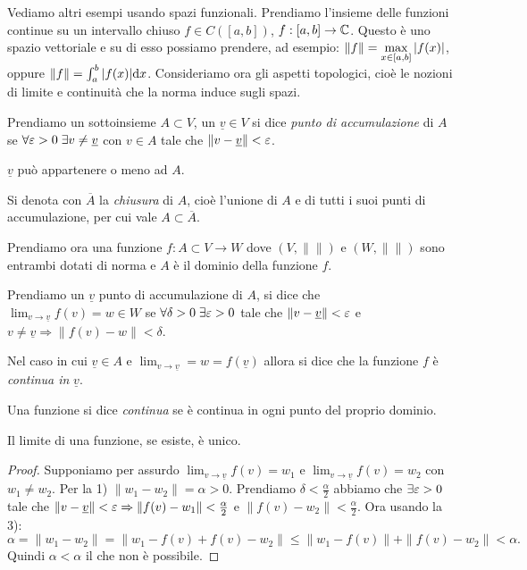 Vediamo altri esempi usando spazi funzionali. Prendiamo l'insieme delle
funzioni continue su un intervallo chiuso $f \in C\left( [a, b] \right)$,
$f: [a, b] \to \mathbb C$. Questo è uno spazio vettoriale e su di esso possiamo
prendere, ad esempio: $\|f\| = \displaystyle \max_{x \in [a, b]} {\left|f(x)\right|}$,
oppure $\|f\| = \int_a^b {\left|f(x)\right|} \mathrm{d} x$.
Consideriamo ora gli aspetti topologici, cioè le nozioni di limite e continuità
che la norma induce sugli spazi.
\begin{definition}
Prendiamo un sottoinsieme $A \subset V$, un $\underline{v} \in V$ si dice
\emph{punto di accumulazione} di $A$ se $\forall \varepsilon > 0 \; \exists v \neq
\underline{v}$ con $v \in A$ tale che  $\|v - \underline{v}\| < \varepsilon$. 
\end{definition}
\begin{remark}
$\underline{v}$ può appartenere o meno ad $A$.
\end{remark}
\begin{definition}
Si denota con $\overline{A}$ la \emph{chiusura} di $A$, cioè l'unione di $A$ e
di tutti i suoi punti di accumulazione, per cui vale $A \subset \overline{A}$.
\end{definition}
Prendiamo ora una funzione $f: A \subset V \to W$ dove $\left(V, \| \| \right)$ 
e $\left(W, \| \| \right)$ sono entrambi dotati di norma e $A$ è il dominio
della funzione $f$.
\begin{definition}
Prendiamo un $\underline{v}$ punto di accumulazione di $A$, si dice che 
$\displaystyle \lim_{v \to \underline{v}} f(v) = w \in W$ se 
$\forall \delta > 0 \; \exists \varepsilon > 0$ tale che $ \|v - \underline{v}\| <
\varepsilon$ e $v \neq \underline{v} \Rightarrow \|f(v) - w\| < \delta$.
\end{definition}
\begin{definition}
Nel caso in cui $\underline{v} \in A$ e $\lim_{v \to \underline{v}} = w =
f(\underline{v})$ allora si dice che la funzione $f$ è \emph{continua in}
$\underline{v}$.
\end{definition}
\begin{definition}[continuità]
Una funzione si dice \emph{continua} se è continua in ogni punto del proprio
dominio.
\end{definition}
\begin{theorem}
Il limite di una funzione, se esiste, è unico.
\end{theorem}
\begin{proof}
Supponiamo per assurdo $ \displaystyle \lim_{v \to \underline{v}} f(v) = w_1$
e $\lim_{v \to \underline{v}} f(v) = w_2$ con $w_1 \neq w_2$. Per la 1)
$\|w_1 - w_2\| = \alpha > 0$. Prendiamo $\delta < \frac{\alpha}{2}$ abbiamo
che $\exists \varepsilon > 0$ tale che $\|v - \underline{v}\| < \varepsilon \Rightarrow
\|f(v) - w_1\| < \frac{\alpha}{2}$ e $\|f(v) - w_2\| < \frac{\alpha}{2}$. Ora
usando la 3):
\[
	\alpha = \|w_1 - w_2\| = \|w_1 - f(v) + f(v) - w_2\| \leq \|w_1 - f(v)\| +
	\|f(v) - w_2\| < \alpha
.\] 
Quindi $\alpha < \alpha$ il che non è possibile.
\end{proof}
